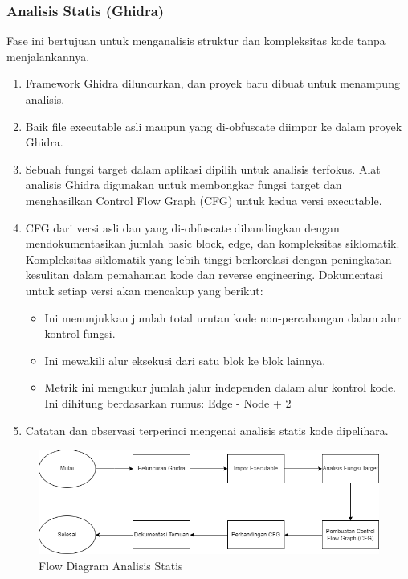 \subsubsection{Analisis Statis (Ghidra)}
Fase ini bertujuan untuk menganalisis struktur dan kompleksitas kode tanpa menjalankannya.
\begin{enumerate}
	\item {} Framework Ghidra diluncurkan, dan proyek baru dibuat untuk menampung analisis.
	\item {} Baik file executable asli maupun yang di-obfuscate diimpor ke dalam proyek Ghidra.
	\item {} Sebuah fungsi target dalam aplikasi dipilih untuk analisis terfokus. Alat analisis Ghidra digunakan untuk membongkar fungsi target dan menghasilkan Control Flow Graph (CFG) untuk kedua versi executable.
	\item {} CFG dari versi asli dan yang di-obfuscate dibandingkan dengan mendokumentasikan jumlah basic block, edge, dan kompleksitas siklomatik. Kompleksitas siklomatik yang lebih tinggi berkorelasi dengan peningkatan kesulitan dalam pemahaman kode dan reverse engineering. Dokumentasi untuk setiap versi akan mencakup yang berikut:
	      \begin{itemize}
		      \item {} Ini menunjukkan jumlah total urutan kode non-percabangan dalam alur kontrol fungsi.
		      \item {} Ini mewakili alur eksekusi dari satu blok ke blok lainnya.
		      \item {} Metrik ini mengukur jumlah jalur independen dalam alur kontrol kode. Ini dihitung berdasarkan rumus: Edge - Node + 2
	      \end{itemize}
	\item {} Catatan dan observasi terperinci mengenai analisis statis kode dipelihara.
\end{enumerate}

\begin{figure}
	\centering
	\includegraphics[width=1\textwidth]
	{assets/pics/Static.png}
	\caption{Flow Diagram Analisis Statis}
\end{figure}

